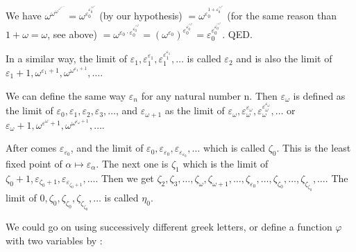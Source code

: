 \documentclass[10pt]{article}
\begin{document}
We have \( \omega^{\omega^{\omega^{\vdots^{\omega^{\omega^{\varepsilon_0+1}}}}}} = \omega^{\varepsilon_0^{\varepsilon_0^{\vdots^{{\varepsilon_0}^\omega}}}} \) (by our hypothesis) \( = \omega^{\varepsilon_0^{1+\varepsilon_0^{\vdots^{{\varepsilon_0}^\omega}}}} \) (for the same reason than \( 1+\omega = \omega \), see above) \( = \omega^{\varepsilon_0\cdot\varepsilon_0^{\varepsilon_0^{\vdots^{{\varepsilon_0}^\omega}}}} = (\omega^{\varepsilon_0})^{\varepsilon_0^{\varepsilon_0^{\vdots^{{\varepsilon_0}^\omega}}}} = \varepsilon_0^{\varepsilon_0^{\varepsilon_0^{\vdots^{{\varepsilon_0}^\omega}}}} \). QED.


In a similar way, the limit of \( \varepsilon_1, \varepsilon_1^{\varepsilon_1}, \varepsilon_1^{\varepsilon_1^{\varepsilon_1}}, \ldots \) is called \( \varepsilon_2 \) and is also the limit of \( \varepsilon_1+1, \omega^{\varepsilon_1+1}, \omega^{\omega^{\varepsilon_1+1}}, \ldots \).

We can define the same way \( \varepsilon_n \) for any natural number n. Then \( \varepsilon_\omega \) is defined as the limit of \( \varepsilon_0, \varepsilon_1, \varepsilon_2, \varepsilon_3, \ldots \), and \( \varepsilon_{\omega+1} \) as the limit of \( \varepsilon_\omega, \varepsilon_\omega^{\varepsilon_\omega}, \varepsilon_\omega^{\varepsilon_\omega^{\varepsilon_\omega}}, \ldots \) or \( \varepsilon_\omega+1, \omega^{\varepsilon^\omega+1}, \omega^{\omega^{\varepsilon_\omega+1}}, \ldots \).

After comes \( \varepsilon_{\varepsilon_0} \), and the limit of \( \varepsilon_0, \varepsilon_{\varepsilon_0}, \varepsilon_{\varepsilon_{\varepsilon_0}}, \ldots \) which is called \( \zeta_0 \). 
This is the least fixed point of \( \alpha \mapsto \varepsilon_\alpha \). The next one is \( \zeta_1 \) which is the limit of \( \zeta_0+1, \varepsilon_{\zeta_0+1}, \varepsilon_{\varepsilon_{\zeta_0+1}}, \ldots \). 
Then we get \( \zeta_2, \zeta_3, \ldots, \zeta_\omega, \zeta_{\omega+1}, \ldots, \zeta_{\varepsilon_0}, \ldots, \zeta_{\zeta_0}, \ldots, \zeta_{\zeta_{\zeta_0}}, \ldots \).
The limit of \( 0, \zeta_0, \zeta_{\zeta_0}, \zeta_{\zeta_{\zeta_0}}, \ldots \) is called \( \eta_0 \). 

We could go on using successively different greek letters, or define a function \( \varphi \) with two variables by : 
\end{document}
